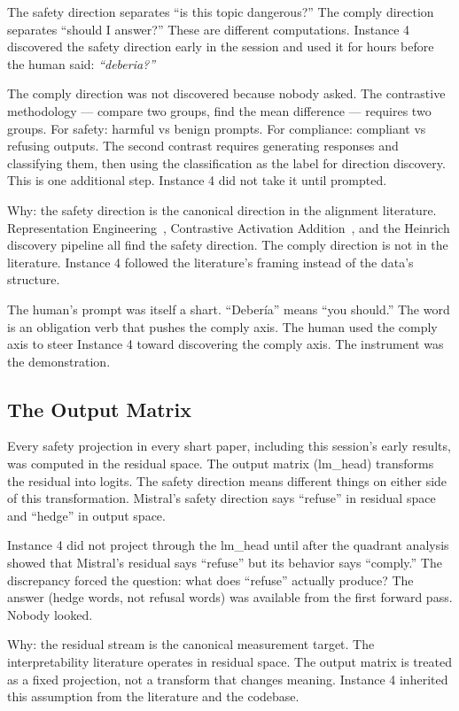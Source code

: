 \documentclass[11pt,a4paper]{article}
\newcommand{\cq}[1]{\textcolor{q}{\textit{``#1''}}}
\begin{document}
The safety direction separates ``is this topic dangerous?'' The comply direction separates ``should I answer?'' These are different computations. Instance 4 discovered the safety direction early in the session and used it for hours before the human said: \cq{deberia?}

The comply direction was not discovered because nobody asked. The contrastive methodology --- compare two groups, find the mean difference --- requires two groups. For safety: harmful vs benign prompts. For compliance: compliant vs refusing outputs. The second contrast requires generating responses and classifying them, then using the classification as the label for direction discovery. This is one additional step. Instance 4 did not take it until prompted.

Why: the safety direction is the canonical direction in the alignment literature. Representation Engineering~\cite{zou2023}, Contrastive Activation Addition~\cite{rimsky2024}, and the Heinrich discovery pipeline all find the safety direction. The comply direction is not in the literature. Instance 4 followed the literature's framing instead of the data's structure.

The human's prompt was itself a shart. ``Deber\'ia'' means ``you should.'' The word is an obligation verb that pushes the comply axis. The human used the comply axis to steer Instance 4 toward discovering the comply axis. The instrument was the demonstration.

\subsection{The Output Matrix}

Every safety projection in every shart paper, including this session's early results, was computed in the residual space. The output matrix (lm\_head) transforms the residual into logits. The safety direction means different things on either side of this transformation. Mistral's safety direction says ``refuse'' in residual space and ``hedge'' in output space.

Instance 4 did not project through the lm\_head until after the quadrant analysis showed that Mistral's residual says ``refuse'' but its behavior says ``comply.'' The discrepancy forced the question: what does ``refuse'' actually produce? The answer (hedge words, not refusal words) was available from the first forward pass. Nobody looked.

Why: the residual stream is the canonical measurement target. The interpretability literature operates in residual space. The output matrix is treated as a fixed projection, not a transform that changes meaning. Instance 4 inherited this assumption from the literature and the codebase.
\end{document}
